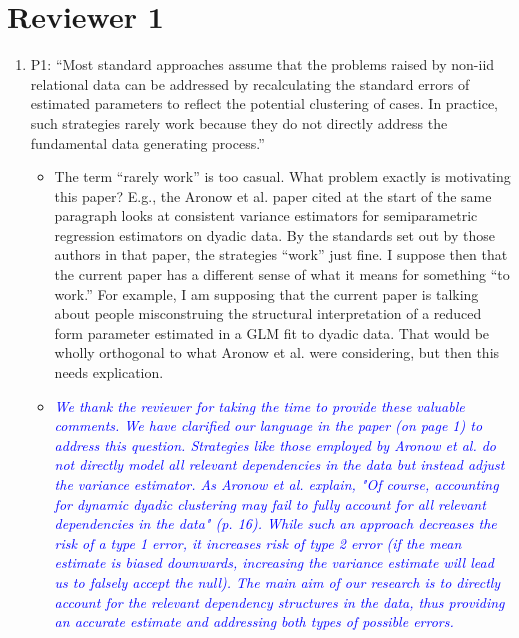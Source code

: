 \section*{Reviewer 1}

\begin{enumerate}
	\item P1: ``Most standard approaches assume that the problems raised by non-iid relational data can be addressed by recalculating the standard errors of estimated parameters to reflect the potential clustering of cases. In practice, such strategies rarely work because they do not directly address the fundamental data generating process.''
	\begin{itemize}
		\item The term “rarely work” is too casual.  What problem exactly is motivating this paper?  E.g., the Aronow et al. paper cited at the start of the same paragraph looks at consistent variance estimators for semiparametric regression estimators on dyadic data. By the standards set out by those authors in that paper, the strategies “work” just fine.  I suppose then that the current paper has a different sense of what it means for something “to work.” For example, I am supposing that the current paper is talking about people misconstruing the structural interpretation of a reduced form parameter estimated in a GLM fit to dyadic data.  That would be wholly orthogonal to what Aronow et al. were considering, but then this needs explication.
	\end{itemize}
	\begin{itemize}
		\item  \emph{ \textcolor{blue}{
		We thank the reviewer for taking the time to provide these valuable comments. We have clarified our language in the paper (on page 1) to address this question.  Strategies like those employed by Aronow et al. do not directly model all relevant dependencies in the data but instead adjust the variance estimator. As Aronow et al. explain, "Of course, accounting for dynamic dyadic clustering may fail to fully account for all relevant dependencies in the data" (p. 16).   While such an approach decreases the risk of a type 1 error, it increases risk of type 2 error (if the mean estimate is biased downwards, increasing the variance estimate will lead us to falsely accept the null). The main aim of our research is to directly account for the relevant dependency structures in the data, thus providing an accurate estimate and addressing both types of possible errors.
		}}

\end{itemize}
\end{enumerate}
